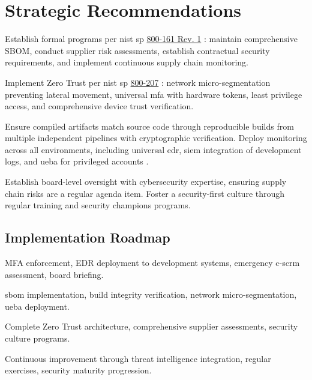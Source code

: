 \section{Strategic Recommendations}
\label{sec:recommendations}

 Establish formal programs per \gls{nist} \gls{sp} \href{https://csrc.nist.gov/pubs/sp/800/161/r1/upd1/final}{800-161 Rev. 1} \cite{boyens_cybersecurity_2024}: maintain comprehensive SBOM, conduct supplier risk assessments, establish contractual security requirements, and implement continuous supply chain monitoring.

 Implement Zero Trust per \gls{nist} \gls{sp} \href{https://csrc.nist.gov/pubs/sp/800/207/final}{800-207} \cite{rose_zero_2020}: network micro-segmentation preventing lateral movement, universal \gls{mfa} with hardware tokens, least privilege access, and comprehensive device trust verification.

 Ensure compiled artifacts match source code through reproducible builds from multiple independent pipelines with cryptographic verification. Deploy monitoring across all environments, including universal \gls{edr}, \gls{siem} integration of development logs, and \gls{ueba} for privileged accounts \cite{litan_market_2015}.

 Establish board-level oversight with cybersecurity expertise, ensuring supply chain risks are a regular agenda item. Foster a security-first culture through regular training and security champions programs.

\subsection{Implementation Roadmap}

 MFA enforcement, EDR deployment to development systems, emergency \gls{c-scrm} assessment, board briefing.

 \gls{sbom} implementation, build integrity verification, network micro-segmentation, \gls{ueba} deployment.

 Complete Zero Trust architecture, comprehensive supplier assessments, security culture programs.

 Continuous improvement through threat intelligence integration, regular exercises, security maturity progression.
